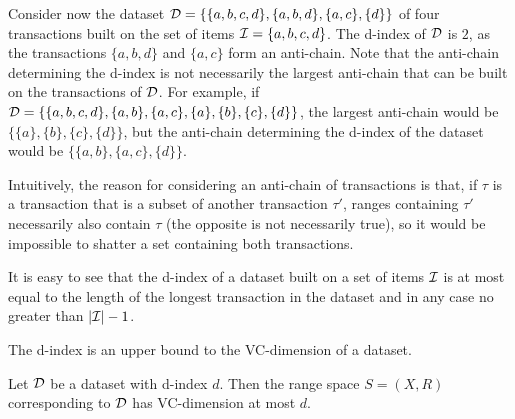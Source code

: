 Consider now the dataset ${\cal D}=\{\{a,b,c,d\},\{a,b,d\},\{a,c\},\{d\}\}$ of four
transactions built on the set of items ${\cal I}=\{a,b,c,d\}$. The d-index of ${\cal D}$ is
$2$, as the transactions $\{a,b,d\}$ and $\{a,c\}$ form an anti-chain.
Note that the anti-chain determining the d-index 
is not necessarily the largest anti-chain that can be built on the transactions of
${\cal D}$. For example, if
${\cal D}=\{\{a,b,c,d\},\{a,b\},\{a,c\},\{a\},\{b\},\{c\},\{d\}\}$, the largest
anti-chain would be $\{\{a\},\{b\},\{c\},\{d\}\}$, but the anti-chain
determining the d-index of the dataset 
would be $\{\{a,b\},\{a,c\},\{d\}\}$.

Intuitively, the reason for considering an anti-chain of transactions is  
that, if $\tau$ is a transaction  that is a subset of another transaction
$\tau'$, ranges containing $\tau'$ necessarily also contain $\tau$ (the opposite
is not necessarily true), so it would be impossible to shatter a set containing
both transactions. 


It is easy to see that the d-index of a dataset built on a set of items ${\cal I}$
is at most equal to the length of the longest transaction in the dataset and in
any case no greater than $|{\cal I}|-1$.


The d-index is an upper bound to the VC-dimension of a dataset.

\begin{theorem}\label{lem:vcdimupperb}
  Let ${\cal D}$ be a dataset with d-index $d$. Then the range space $S=(X,R)$
  corresponding to ${\cal D}$ has VC-dimension at most $d$.
\end{theorem}

